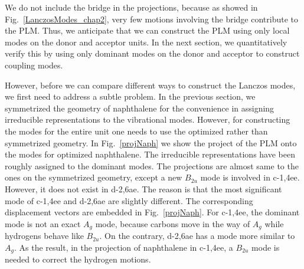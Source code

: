 
We do not include the bridge in the projections, because as showed in Fig.~\ref{LanczosModes_chap2}, very few motions involving the bridge contribute to the PLM.
Thus, we anticipate that we can construct the PLM using only local modes on the donor and acceptor units.
 In the next section, we  quantitatively verify this by using only
dominant modes on the  donor and acceptor to construct coupling modes.

However, before we can compare different ways to construct the Lanczos modes, we first need to
address a  subtle problem.   In the previous section, we symmetrized the geometry of naphthalene
for the convenience in assigning  irreducible representations to the vibrational modes.
However, for constructing the modes
for the entire unit one needs to use the optimized rather than symmetrized geometry.
In Fig.~\ref{projNaph}  we show the project of the PLM onto the modes for optimized
naphthalene.  The irreducible representations have been roughly assigned to the dominant modes.
The projections are
almost same to the ones on the symmetrized geometry, except a new $B_{2u}$ mode is involved
in c-1,4ee. However, it does not exist in d-2,6ae. The reason is that the most significant
mode of c-1,4ee and d-2,6ae are slightly different. The corresponding displacement vectors are
embedded in Fig.~\ref{projNaph}. For c-1,4ee, the dominant mode is not an exact $A_g$ mode, because
carbons move in the way of $A_g$ while
hydrogens behave like $B_{2u}$. On the contrary, d-2,6ae has
a mode more similar to $A_g$.
As the result, in the projection of naphthalene in c-1,4ee, a  $B_{2u}$
mode is needed to correct the hydrogen motions.

